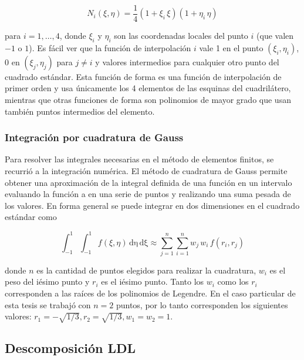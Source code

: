 \begin{equation}
    N_i(\xi, \eta) = \frac{1}{4} (1 + \xi_i \, \xi) (1 + \eta_i \, \eta)
\end{equation}

para $i = 1, \ldots, 4$, donde $\xi_i$ y $\eta_i$ son las coordenadas locales del punto $i$ (que valen $-1$ o $1$).  Es fácil ver que la función de interpolación $i$ vale 1 en el punto $(\xi_i, \eta_i)$, 0 en $(\xi_j, \eta_j)$ para $j \neq i$ y valores intermedios para cualquier otro punto del cuadrado estándar. Esta función de forma es una función de interpolación de primer orden y usa únicamente los 4 elementos de las esquinas del cuadrilátero, mientras que otras funciones de forma son polinomios de mayor grado que usan también puntos intermedios del elemento.

\subsubsection*{Integración por cuadratura de Gauss}

Para resolver las integrales necesarias en el método de elementos finitos, se recurrió a la integración numérica. El método de cuadratura de Gauss permite obtener una aproximación de la integral definida de una función en un intervalo evaluando la función a en una serie de puntos y realizando una suma pesada de los valores. En forma general se puede integrar en dos dimensiones en el cuadrado estándar como

\begin{equation}
    \int_{-1}^1 \int_{-1}^{1} f(\xi, \eta) \, \mathrm{d\eta} \, \mathrm{d\xi} \approx \sum_{j=1}^{n} \sum_{i=1}^{n} w_j \, w_i \, f(r_i, r_j)
\end{equation}

donde $n$ es la cantidad de puntos elegidos para realizar la cuadratura, $w_i$ es el peso del iésimo punto y $r_i$ es el iésimo punto. Tanto los $w_i$ como los $r_i$ corresponden a las raíces de los polinomios de Legendre. En el caso particular de esta tesis se trabajó con $n = 2$ puntos, por lo tanto corresponden los siguientes valores: $r_1 = -\sqrt{1/3}, r_2 = \sqrt{1/3}, w_1 = w_2 = 1$.



\subsection*{Descomposición LDL}

